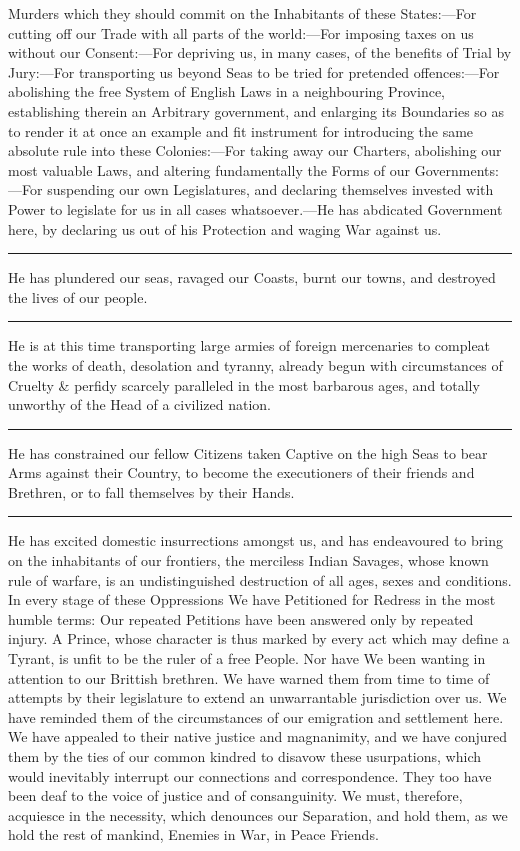 \documentclass{article}
\begin{document}
Murders which they should commit on the Inhabitants of these
States:---For cutting off our Trade with all parts of the world:---For
imposing taxes on us without our Consent:---For depriving us, in many
cases, of the benefits of Trial by Jury:---For transporting us beyond
Seas to be tried for pretended offences:---For abolishing the free
System of English Laws in a neighbouring Province, establishing
therein an Arbitrary government, and enlarging its Boundaries so as to
render it at once an example and fit instrument for introducing the
same absolute rule into these Colonies:---For taking away our
Charters, abolishing our most valuable Laws, and altering
fundamentally the Forms of our Governments:---For suspending our own
Legislatures, and declaring themselves invested with Power to
legislate for us in all cases whatsoever.---He has abdicated
Government here, by declaring us out of his Protection and waging War
against us.\rule[.5ex]{2em}{.2pt}He has plundered our seas, ravaged
our Coasts, burnt our towns, and destroyed the lives of our
people.\rule[.5ex]{2em}{.2pt}He is at this time transporting large
armies of foreign mercenaries to compleat the works of death,
desolation and tyranny, already begun with circumstances of Cruelty \&
perfidy scarcely paralleled in the most barbarous ages, and totally
unworthy of the Head of a civilized nation.\rule[.5ex]{2em}{.2pt}He
has constrained our fellow Citizens taken Captive on the high Seas to
bear Arms against their Country, to become the executioners of their
friends and Brethren, or to fall themselves by their
Hands.\rule[.5ex]{2em}{.2pt}He has excited domestic insurrections
amongst us, and has endeavoured to bring on the inhabitants of our
frontiers, the merciless Indian Savages, whose known rule of warfare,
is an undistinguished destruction of all ages, sexes and conditions.
In every stage of these Oppressions We have Petitioned for Redress in
the most humble terms: Our repeated Petitions have been answered only
by repeated injury. A Prince, whose character is thus marked by every
act which may define a Tyrant, is unfit to be the ruler of a free
People. Nor have We been wanting in attention to our Brittish
brethren. We have warned them from time to time of attempts by their
legislature to extend an unwarrantable jurisdiction over us. We have
reminded them of the circumstances of our emigration and settlement
here. We have appealed to their native justice and magnanimity, and we
have conjured them by the ties of our common kindred to disavow these
usurpations, which would inevitably interrupt our connections and
correspondence. They too have been deaf to the voice of justice and of
consanguinity. We must, therefore, acquiesce in the necessity, which
denounces our Separation, and hold them, as we hold the rest of
mankind, Enemies in War, in Peace Friends.
\end{document}
